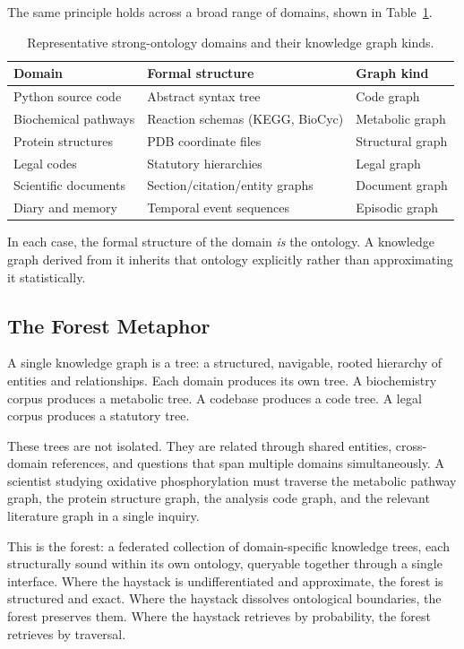 \documentclass{article}
\begin{document}
The same principle holds across a broad range of domains, shown in
Table~\ref{tab:domains}.

\begin{table}[h]
\centering
\caption{Representative strong-ontology domains and their knowledge graph kinds.}
\label{tab:domains}
\begin{tabular}{lll}
\toprule
\textbf{Domain} & \textbf{Formal structure} & \textbf{Graph kind} \\
\midrule
Python source code        & Abstract syntax tree              & Code graph \\
Biochemical pathways      & Reaction schemas (KEGG, BioCyc)   & Metabolic graph \\
Protein structures        & PDB coordinate files              & Structural graph \\
Legal codes               & Statutory hierarchies             & Legal graph \\
Scientific documents      & Section/citation/entity graphs    & Document graph \\
Diary and memory          & Temporal event sequences          & Episodic graph \\
\bottomrule
\end{tabular}
\end{table}

In each case, the formal structure of the domain \emph{is} the ontology.  A
knowledge graph derived from it inherits that ontology explicitly rather than
approximating it statistically.

\subsection{The Forest Metaphor}

A single knowledge graph is a tree: a structured, navigable, rooted hierarchy of
entities and relationships.  Each domain produces its own tree.  A biochemistry
corpus produces a metabolic tree.  A codebase produces a code tree.  A legal
corpus produces a statutory tree.

These trees are not isolated.  They are related through shared entities,
cross-domain references, and questions that span multiple domains simultaneously.
A scientist studying oxidative phosphorylation must traverse the metabolic
pathway graph, the protein structure graph, the analysis code graph, and the
relevant literature graph in a single inquiry.

This is the forest: a federated collection of domain-specific knowledge trees,
each structurally sound within its own ontology, queryable together through a
single interface.  Where the haystack is undifferentiated and approximate, the
forest is structured and exact.  Where the haystack dissolves ontological
boundaries, the forest preserves them.  Where the haystack retrieves by
probability, the forest retrieves by traversal.
\end{document}
